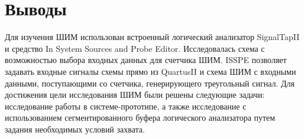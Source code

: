 \section{Выводы}

Для изучения ШИМ использован встроенный логический анализатор SignalTapII и средство In System Sources and Probe Editor. Исследовалась схема с возможностью выбора входных данных для счетчика ШИМ. ISSPE позволяет задавать входные сигналы схемы прямо из QuartusII и схема ШИМ с входными данными, поступающими со счетчика, генерирующего треугольный сигнал. Для достижения цели исследования ШИМ были решены следующие задачи: исследование работы в системе-прототипе, а также исследование с использованием сегментированного буфера логического анализатора путем задания необходимых условий захвата.

